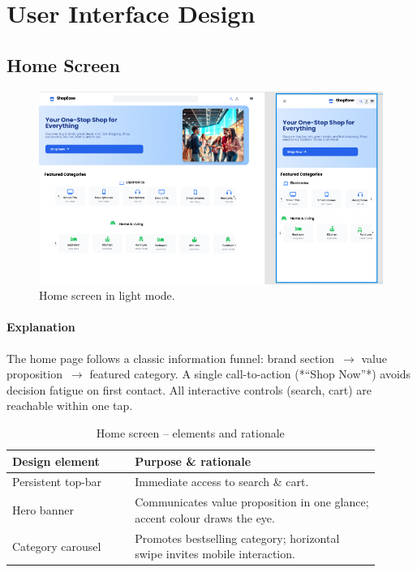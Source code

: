 \documentclass[12pt]{article}
\begin{document}
	\section{User Interface Design}\label{sec:user-interface-design}


	\subsection{Home Screen}\label{subsec:home-screen}

		\begin{figure}[H]
		\centering
		\includegraphics[width=\linewidth]{pictures/main/Home_figma}%
		\caption{Home screen in light mode.}
		\label{fig:ui-home}
	\end{figure}

	\paragraph{Explanation}%
	The home page follows a classic information funnel: brand section~$\rightarrow$ value
	proposition~$\rightarrow$ featured category. A single call-to-action
	(*“Shop Now”*) avoids decision fatigue on first contact.
	All interactive controls (search, cart) are reachable within one
	tap.

	\begin{table}[H]
		\centering
		\caption{Home screen – elements and rationale}
		\label{tab:home-elements}
		\begin{tabular}{p{0.30\linewidth} p{0.60\linewidth}}
			\toprule
			\textbf{Design element} & \textbf{Purpose \& rationale} \\ \midrule
			Persistent top-bar      & Immediate access to search \& cart.\\
			Hero banner             & Communicates value proposition in one glance; accent colour draws the eye.\\
			Category carousel       & Promotes bestselling category; horizontal swipe invites mobile interaction.\\

			\bottomrule
		\end{tabular}
	\end{table}
\end{document}
